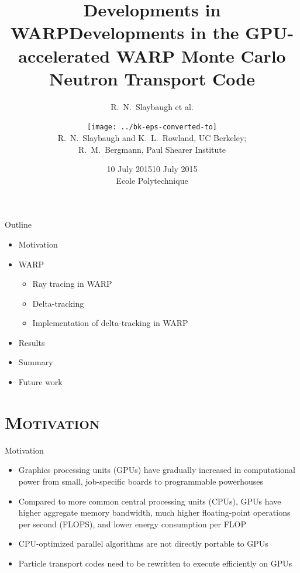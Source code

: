 \documentclass[xcolor=x11names, compress, handout]{beamer}
\title{Developments in WARP}
\author{R.\ N.\ Slaybaugh et al.}
\date{10 July 2015}
\renewcommand{\(}{\begin{columns}}
\renewcommand{\)}{\end{columns}}
\newcommand{\<}[1]{\begin{column}{#1}}
\renewcommand{\>}{\end{column}}
\begin{document}
\begin{frame}
\title{Developments in the GPU-accelerated WARP Monte Carlo Neutron Transport Code}
\author{\texttt{[image: ../bk-eps-converted-to]}\\R.\ N.\ Slaybaugh and K.\ L.\ Rowland, UC Berkeley; \\R.\ M.\ Bergmann, Paul Shearer Institute}
\date{10 July 2015 \\ Ecole Polytechnique}
\titlepage
\end{frame}


\begin{frame}[fragile]{Outline}
	\begin{itemize}
	\item{Motivation}
	\item{WARP}
	\begin{itemize}
	    \item{Ray tracing in WARP}
	    \item{Delta-tracking}
	    \item{Implementation of delta-tracking in WARP}
	\end{itemize}
	\item{Results}
	\item{Summary}
	\item{Future work}
	\end{itemize}
\end{frame}


\section{\scshape Motivation}
\begin{frame}{Motivation}
	\begin{itemize}
	\item{Graphics processing units (GPUs) have gradually increased in computational power from small,
	job-specific boards to programmable powerhouses}
	\pause
	\item{Compared to more common central processing units (CPUs), GPUs have higher aggregate memory
	bandwidth, much higher floating-point operations per second (FLOPS), and lower energy consumption
	per FLOP \cite{warp}}
	\pause
	\item{CPU-optimized parallel algorithms are not directly portable to GPUs}
	\pause
	\item{Particle transport codes need to be rewritten to execute efficiently on GPUs 
	\cite{warp}}
	\end{itemize}
\end{frame}
\end{document}
